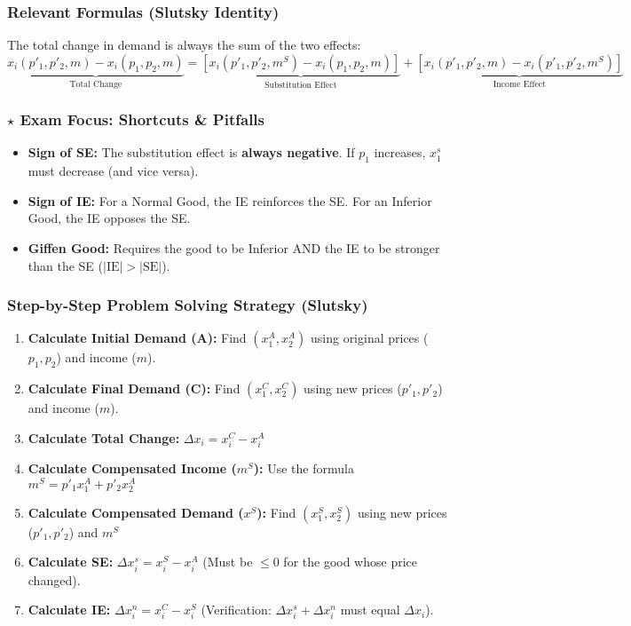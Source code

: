 \documentclass{article}
\begin{document}
\subsubsection*{Relevant Formulas (Slutsky Identity)}
The total change in demand is always the sum of the two effects: \[\underbrace{x_i(p'_1, p'_2, m) - x_i(p_1, p_2, m)}_{\text{Total Change}} = \underbrace{\left[x_i(p'_1, p'_2, m^S) - x_i(p_1, p_2, m)\right]}_{\text{Substitution Effect}} + \underbrace{\left[x_i(p'_1, p'_2, m) - x_i(p'_1, p'_2, m^S)\right]}_{\text{Income Effect}}\]

\subsubsection*{$\star$ Exam Focus: Shortcuts \& Pitfalls}
\begin{itemize}
	\item \textbf{Sign of SE:} The substitution effect is \textbf{always negative}. If $p_1$ increases, $x_1^s$ must decrease (and vice versa).
	\item \textbf{Sign of IE:} For a Normal Good, the IE reinforces the SE. For an Inferior Good, the IE opposes the SE.
	\item \textbf{Giffen Good:} Requires the good to be Inferior AND the IE to be stronger than the SE ($|\text{IE}| > |\text{SE}|$).
\end{itemize}

\subsubsection*{Step-by-Step Problem Solving Strategy (Slutsky)}
\begin{enumerate}
	\item \textbf{Calculate Initial Demand (A):} Find $(x_1^A, x_2^A)$ using original prices ($p_1, p_2$) and income ($m$).
	\item \textbf{Calculate Final Demand (C):} Find $(x_1^C, x_2^C)$ using new prices ($p'_1, p'_2$) and income ($m$).
	\item \textbf{Calculate Total Change:} $\Delta x_i = x_i^C - x_i^A$
	\item \textbf{Calculate Compensated Income ($m^S$):} Use the formula $m^S = p'_1 x_1^A + p'_2 x_2^A$
	\item \textbf{Calculate Compensated Demand ($x^S$):} Find $(x_1^S, x_2^S)$ using new prices ($p'_1, p'_2$) and $m^S$
	\item \textbf{Calculate SE:} $\Delta x_i^s = x_i^S - x_i^A$ (Must be $\leq 0$ for the good whose price changed).
	\item \textbf{Calculate IE:} $\Delta x_i^n = x_i^C - x_i^S$ (Verification: $\Delta x_i^s + \Delta x_i^n$ must equal $\Delta x_i$).
\end{enumerate}
\end{document}
